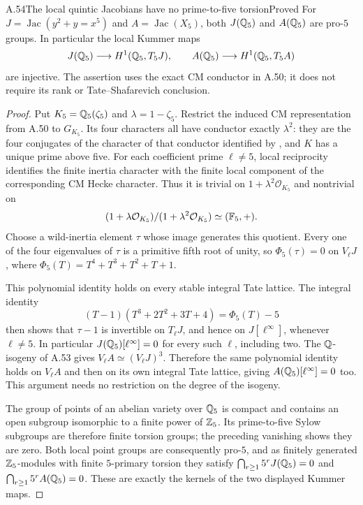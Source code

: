 \begin{statement}{A.54}{The local quintic Jacobians have no prime-to-five torsion}{Proved}
For $J=\operatorname{Jac}(y^2+y=x^5)$ and
$A=\operatorname{Jac}(X_5)$, both $J(\mathbb Q_5)$ and $A(\mathbb Q_5)$ are pro-$5$
groups. In particular the local Kummer maps
\[
 J(\mathbb Q_5)\longrightarrow H^1(\mathbb Q_5,T_5J),\qquad
 A(\mathbb Q_5)\longrightarrow H^1(\mathbb Q_5,T_5A)
\]
are injective. The assertion uses the exact CM conductor in A.50;
it does not require its rank or Tate--Shafarevich conclusion.
\end{statement}
\begin{proof}
Put $K_5=\mathbb Q_5(\zeta_5)$ and $\lambda=1-\zeta_5$.
Restrict the induced CM representation from A.50 to $G_{K_5}$.
Its four characters all have conductor exactly $\lambda^2$:
they are the four conjugates of the character of that conductor
identified by \citet[p.~439]{AMDarmon2000}, and $K$ has a unique
prime above five. For each coefficient prime $\ell\ne5$, local
reciprocity identifies the finite inertia character with the finite
local component of the corresponding CM Hecke character. Thus it is
trivial on $1+\lambda^2\mathcal O_{K_5}$ and nontrivial on
\[
 (1+\lambda\mathcal O_{K_5})/
 (1+\lambda^2\mathcal O_{K_5})\simeq(\mathbb F_5,+).
\]
Choose a wild-inertia element $\tau$ whose image generates this
quotient. Every one of the four eigenvalues of $\tau$ is a primitive
fifth root of unity, so
$\Phi_5(\tau)=0$ on $V_\ell J$, where
$\Phi_5(T)=T^4+T^3+T^2+T+1$.

This polynomial identity holds on every stable integral Tate lattice.
The integral identity
\[
 (T-1)(T^3+2T^2+3T+4)=\Phi_5(T)-5
\]
then shows that $\tau-1$ is invertible on $T_\ell J$, and hence on
$J[\ell^\infty]$, whenever $\ell\ne5$. In particular
$J(\mathbb Q_5)[\ell^\infty]=0$ for every such $\ell$, including two.
The $\mathbb Q$-isogeny of A.53 gives
$V_\ell A\simeq(V_\ell J)^3$. Therefore the same polynomial identity
holds on $V_\ell A$ and then on its own integral Tate lattice, giving
$A(\mathbb Q_5)[\ell^\infty]=0$ too. This argument needs no restriction on
the degree of the isogeny.

The group of points of an abelian variety over $\mathbb Q_5$ is compact and
contains an open subgroup isomorphic to a finite power of $\mathbb Z_5$.
Its prime-to-five Sylow subgroups are therefore finite torsion groups;
the preceding vanishing shows they are zero. Both local point groups
are consequently pro-$5$, and as finitely generated $\mathbb Z_5$-modules
with finite $5$-primary torsion they satisfy
$\bigcap_{r\ge1}5^rJ(\mathbb Q_5)=0$ and
$\bigcap_{r\ge1}5^rA(\mathbb Q_5)=0$. These are exactly the kernels of the
two displayed Kummer maps.


\end{proof}
